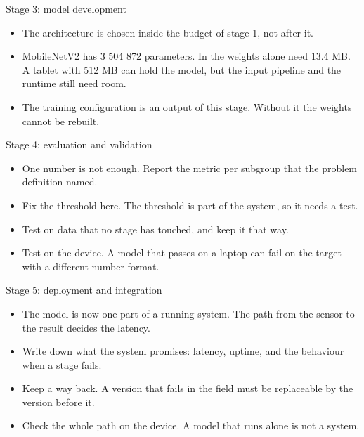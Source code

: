 \begin{frame}{Stage 3: model development}
  \small
  \begin{itemize}
    \item The architecture is chosen inside the budget of stage 1, not
          after it.
    \item MobileNetV2 has 3 504 872 parameters. In  the
          weights alone need 13.4 MB. A tablet with 512 MB can hold the
          model, but the input pipeline and the runtime still need room.
    \item The training configuration is an output of this stage. Without it
          the weights cannot be rebuilt.
  \end{itemize}
\end{frame}

\begin{frame}{Stage 4: evaluation and validation}
  \small
  \begin{itemize}
    \item One number is not enough. Report the metric per subgroup that
          the problem definition named.
    \item Fix the threshold here. The threshold is part of the system, so
          it needs a test.
    \item Test on data that no stage has touched, and keep it that way.
    \item Test on the device. A model that passes on a laptop can fail on
          the target with a different number format.
  \end{itemize}
\end{frame}

\begin{frame}{Stage 5: deployment and integration}
  \small
  \begin{itemize}
    \item The model is now one part of a running system. The path from the
          sensor to the result decides the latency.
    \item Write down what the system promises: latency, uptime, and the
          behaviour when a stage fails.
    \item Keep a way back. A version that fails in the field must be
          replaceable by the version before it.
    \item Check the whole path on the device. A model that runs alone is
          not a system.
  \end{itemize}
\end{frame}

